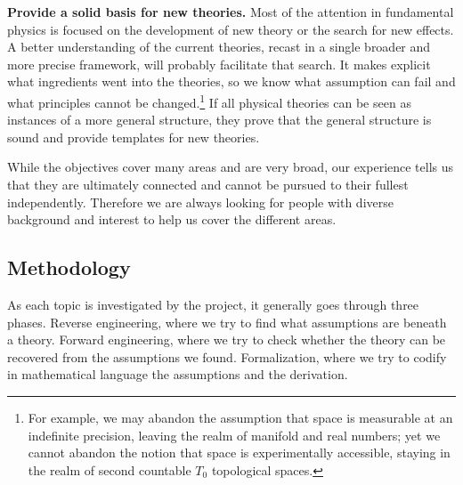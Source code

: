 \documentclass[twocolumn]{article}
\newif\ifextended
\newcommand\fact[2]{\ifextended \emph{#1}. #2 \fi}
\begin{document}
\textbf{Provide a solid basis for new theories.} Most of the attention in fundamental physics is focused on the development of new theory or the search for new effects. A better understanding of the current theories, recast in a single broader and more precise framework, will probably facilitate that search. It makes explicit what ingredients went into the theories, so we know what assumption can fail and what principles cannot be changed.\footnote{For example, we may abandon the assumption that space is measurable at an indefinite precision, leaving the realm of manifold and real numbers; yet we cannot abandon the notion that space is experimentally accessible, staying in the realm of second countable $T_0$ topological spaces.} If all physical theories can be seen as instances of a more general structure, they prove that the general structure is sound and provide templates for new theories.

While the objectives cover many areas and are very broad, our experience tells us that they are ultimately connected and cannot be pursued to their fullest independently. Therefore we are always looking for people with diverse background and interest to help us cover the different areas.

\subsection{Methodology}

As each topic is investigated by the project, it generally goes through three phases. Reverse engineering, where we try to find what assumptions are beneath a theory. Forward engineering, where we try to check whether the theory can be recovered from the assumptions we found. Formalization, where we try to codify in mathematical language the assumptions and the derivation.

\fact{Reverse engineering} {The goal of this phase is to deconstruct an already existing theory or mathematical structure to understand what each piece is supposed to represent physically. One way to conduct such investigation is to ask what would happen if a particular characteristic of the framework would fail.\footnote{For example, a line of reasoning could be as follows: Hamilton's equations are differential; if they weren't the mapping of densities and areas would not be well defined; maybe Hamiltonian mechanics is not about mapping points but about mapping densities or areas.} This usually leads to a set of necessary assumptions about the physical system one is describing, the ones one must take for the particular description to apply.}
\end{document}
